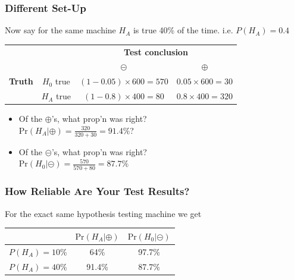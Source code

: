 \documentclass[handout]{beamer}
\newcommand{\blue}[1]{\textcolor{blue2}{#1}}
\newcommand{\prob}{\mbox{Pr}}
\newcommand{\cp}{\oplus}
\newcommand{\cm}{\circleddash}
\begin{document}
\begin{frame}
\frametitle{Different Set-Up}
Now say for the same machine $H_A$ is true 40\% of the time. i.e. $P(H_A)=0.4$
\pause
\begin{center}
  \begin{tabular}{cc|cc}
     \multicolumn{2}{c}{}  & \multicolumn{2}{c}{\textbf{Test conclusion}} \\ 
     &  & $\cm$ & $\cp$ \\ 
\hline
    \textbf{Truth} & $H_0$ true & $(1-0.05) \times 600 = 570$ & $0.05 \times 600 = 30$ \\
     & $H_A$ true & $(1-0.8)\times 400=80$ & $0.8\times 400= 320$\\ 
    \hline
  \end{tabular}
\end{center}

%
%
\begin{itemize}
\pause\item Of the $\cp$'s, what prop'n was right?\\
$\prob(H_A|\cp) = \frac{320}{320+30} = 91.4\%$?  
\pause\item Of the $\cm$'s, what prop'n was right?\\
$\prob(H_0|\cm) = \frac{570}{570+80} = 87.7\%$
\end{itemize}

\end{frame}


\begin{frame}[fragile]
\frametitle{How Reliable Are Your Test Results?}

%
%
For the \blue{exact same} hypothesis testing machine we get
\begin{center}
  \begin{tabular}{c|cc}
    \hline
    & $\prob(H_A|\cp)$ & $\prob(H_0|\cm)$ \\ 
    \hline
    $P(H_A)=10\%$ & 64\% & 97.7\% \\ 
    $P(H_A)=40\%$ & 91.4\% & 87.7\% \\ 
    \hline
  \end{tabular}
\end{center}

\end{frame}
\end{document}
